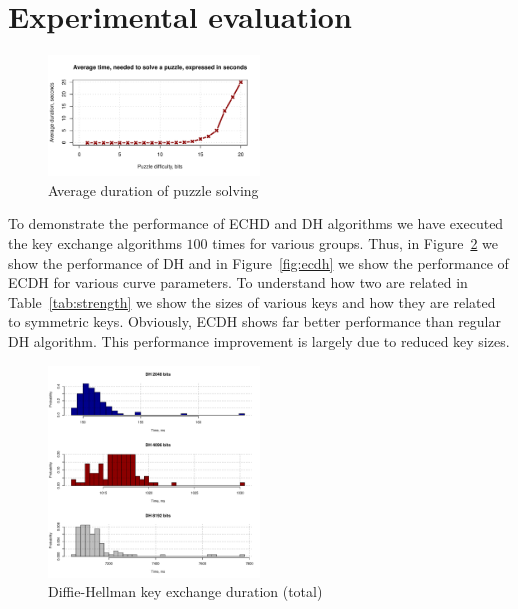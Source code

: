 \section{Experimental evaluation}
\label{section:experiments}



\begin{figure}
	\includegraphics[width=0.5\textwidth]{graphics/puzzle_solution_perf.pdf}
	\caption{Average duration of puzzle solving}
	\label{fig:puzzle}
\end{figure}

To demonstrate the performance of ECHD and DH algorithms we have 
executed the key exchange algorithms $100$ times for various 
groups. Thus, in Figure~\ref{fig:dh} we show the performance of
DH and in Figure~\ref{fig:ecdh} we show the performance 
of ECDH for various curve parameters. To understand how two
are related in Table~\ref{tab:strength} we show the sizes
of various keys and how they are related to symmetric keys.
Obviously, ECDH shows far better performance than regular
DH algorithm. This performance improvement is largely due
to reduced key sizes.

\begin{figure}
	\includegraphics[width=0.5\textwidth]{graphics/dh_computation_hist.pdf}
	\caption{Diffie-Hellman key exchange duration (total)}
	\label{fig:dh}
\end{figure}

